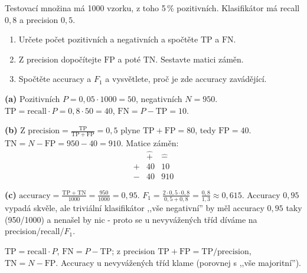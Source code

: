 \begin{zadani}
Testovací množina má 1000 vzorku, z toho 5\,\% pozitivních. Klasifikátor má recall $0{,}8$ a precision $0{,}5$.
\begin{enumerate}[label=(\alph*)]
  \item {} Určete počet pozitivních a negativních a spočtěte $\mathrm{TP}$ a $\mathrm{FN}$.
  \item {} Z precision dopočítejte $\mathrm{FP}$ a poté $\mathrm{TN}$. Sestavte matici záměn.
  \item {} Spočtěte accuracy a $F_1$ a vysvětlete, proč je zde accuracy zavádějící.
\end{enumerate}
\end{zadani}

\begin{reseni}
\textbf{(a)} Pozitivních $P=0{,}05\cdot1000=50$, negativních $N=950$. $\mathrm{TP}=\text{recall}\cdot P=0{,}8\cdot50=40$, $\mathrm{FN}=P-\mathrm{TP}=10$.

\textbf{(b)} Z $\text{precision}=\frac{\mathrm{TP}}{\mathrm{TP}+\mathrm{FP}}=0{,}5$ plyne $\mathrm{TP}+\mathrm{FP}=80$, tedy $\mathrm{FP}=40$. $\mathrm{TN}=N-\mathrm{FP}=950-40=910$. Matice záměn:
\[
\begin{array}{c|cc}
 & \hat{+} & \hat{-}\\\hline
+ & 40 & 10\\
- & 40 & 910
\end{array}
\]

\textbf{(c)} $\text{accuracy}=\frac{\mathrm{TP}+\mathrm{TN}}{1000}=\frac{950}{1000}=0{,}95$. $F_1=\frac{2\cdot0{,}5\cdot0{,}8}{0{,}5+0{,}8}=\frac{0{,}8}{1{,}3}\approx0{,}615$. Accuracy $0{,}95$ vypadá skvěle, ale triviální klasifikátor ,,vše negativní'' by měl accuracy $0{,}95$ taky (950/1000) a nenašel by nic - proto se u nevyvážených tříd díváme na precision/recall/$F_1$.
\end{reseni}

\begin{jadro}
$\mathrm{TP}=\text{recall}\cdot P$, $\mathrm{FN}=P-\mathrm{TP}$; z precision $\mathrm{TP}+\mathrm{FP}=\mathrm{TP}/\text{precision}$, $\mathrm{TN}=N-\mathrm{FP}$. Accuracy u nevyvážených tříd klame (porovnej s ,,vše majoritní'').
\end{jadro}

